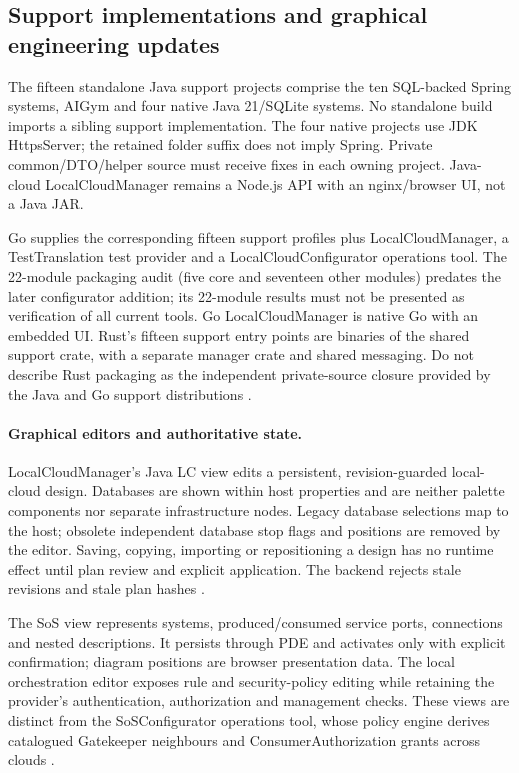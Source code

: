 \documentclass[a4paper]{arrowhead}
\begin{document}
\subsection{Support implementations and graphical engineering updates}
\label{sec:support-engineering-update}
The fifteen standalone Java support projects comprise the ten SQL-backed Spring
systems, AIGym and four native Java 21/SQLite systems. No standalone build imports
a sibling support implementation. The four native projects use JDK HttpsServer;
the retained  folder suffix does not imply Spring. Private
common/DTO/helper source must receive fixes in each owning project. Java-cloud
LocalCloudManager remains a Node.js API with an nginx/browser UI, not a Java JAR.

Go supplies the corresponding fifteen support profiles plus LocalCloudManager,
a TestTranslation test provider and a LocalCloudConfigurator operations tool.
The 22-module packaging audit (five core and seventeen other modules) predates
the later configurator addition;
its 22-module results must not be presented as verification of all current tools.
Go LocalCloudManager is native Go with an embedded UI. Rust's fifteen support
entry points are binaries of the shared support crate, with a separate manager
crate and shared messaging. Do not describe Rust packaging as the independent
private-source closure provided by the Java and Go support distributions
\cite{javaPackaging20261025,goPackaging20261028,rustPackaging20261028}.

\paragraph{Graphical editors and authoritative state.}
LocalCloudManager's Java LC view edits a persistent, revision-guarded local-cloud
design. Databases are shown within host properties and are neither palette
components nor separate infrastructure nodes. Legacy database selections map to
the host; obsolete independent database stop flags and positions are removed by
the editor. Saving, copying, importing or repositioning a design has no runtime
effect until plan review and explicit application. The backend rejects stale
revisions and stale plan hashes \cite{javaDatabaseAssets20261030}.

The SoS view represents systems, produced/consumed service ports, connections and
nested descriptions. It persists through PDE and activates only with explicit
confirmation; diagram positions are browser presentation data. The local
orchestration editor exposes rule and security-policy editing while retaining
the provider's authentication, authorization and management checks. These views
are distinct from the SoSConfigurator operations tool, whose policy engine derives
catalogued Gatekeeper neighbours and ConsumerAuthorization grants across clouds
\cite{javaSoS20261030}.
\end{document}
